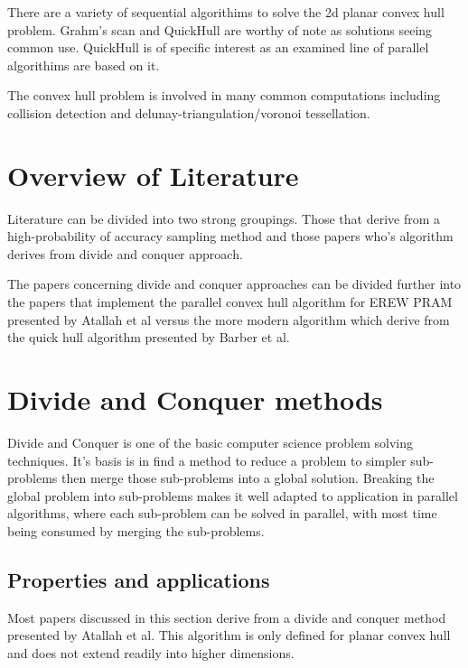 \documentclass[10pt,a4paper]{report}
\begin{document}
There are a variety of sequential algorithims to solve the 2d planar convex hull problem. Grahm's scan\cite{graham1972efficient} and QuickHull\cite{Barber1996} are worthy of note as solutions seeing common use. QuickHull is of specific interest as an examined line of parallel algorithims are based on it\cite{Stein2012CudaHull}\cite{SrikanthFast}.

The convex hull problem is involved in many common computations including collision detection and delunay-triangulation/voronoi tessellation.




\section{Overview of Literature}

Literature can be divided into two strong groupings. Those that derive from a high-probability of accuracy sampling method and those papers who's algorithm derives from divide and conquer approach.

The papers concerning divide and conquer approaches can be divided further into the papers that implement the parallel convex hull algorithm for EREW PRAM presented by Atallah et al versus the more modern algorithm which derive from the quick hull algorithm presented by Barber et al.


\section{Divide and Conquer methods}

Divide and Conquer is one of the basic computer science problem solving techniques. It's basis is in find a method to reduce a problem to simpler sub-problems then merge those sub-problems into a global solution. Breaking the global problem into sub-problems makes it well adapted to application in parallel algorithms, where each sub-problem can be solved in parallel, with most time being consumed by merging the sub-problems.


\subsection{Properties and applications}

Most papers discussed in this section derive from a divide and conquer method presented by Atallah et al\cite{Atallah1986Efficient}.
This algorithm is only defined for planar convex hull and does not extend readily into higher dimensions.
\end{document}
